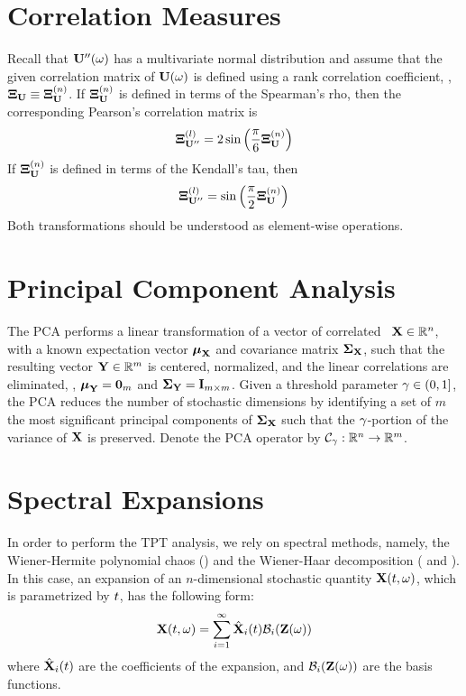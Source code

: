 \renewcommand{\thesection}{S\arabic{section}}
\renewcommand{\thetable}{S\arabic{table}}
\renewcommand{\thefigure}{S\arabic{figure}}
\setcounter{table}{0}
\setcounter{figure}{0}

\section{Correlation Measures} 
Recall that $\mathbf{U}''(\omega)$ has a multivariate normal distribution and assume that the given correlation matrix of $\mathbf{U}(\omega)$ is defined using a rank correlation coefficient, \ie, $\mathbf{\Xi}_{\mathbf{U}} \equiv \mathbf{\Xi}^{(n)}_{\mathbf{U}}$. If $\mathbf{\Xi}^{(n)}_{\mathbf{U}}$ is defined in terms of the Spearman's rho, then the corresponding Pearson's correlation matrix is
\[
  \mathbf{\Xi}^{(l)}_{\mathbf{U}''} = 2 \sin \left( \frac{\pi}{6} \mathbf{\Xi}^{(n)}_{\mathbf{U}} \right)
\]
If $\mathbf{\Xi}^{(n)}_{\mathbf{U}}$ is defined in terms of the Kendall's tau, then
\[
  \mathbf{\Xi}^{(l)}_{\mathbf{U}''} = \sin \left( \frac{\pi}{2} \mathbf{\Xi}^{(n)}_{\mathbf{U}} \right)
\]
Both transformations should be understood as element-wise operations.

\section{Principal Component Analysis} 
The PCA performs a linear transformation of a vector of correlated \rvs\ $\mathbf{X} \in \mathbb{R}^n$, with a known expectation vector $\boldsymbol{\mu}_{\mathbf{X}}$ and covariance matrix $\mathbf{\Sigma}_{\mathbf{X}}$, such that the resulting vector $\mathbf{Y} \in \mathbb{R}^m$ is centered, normalized, and the linear correlations are eliminated, \ie, $\boldsymbol{\mu}_{\mathbf{Y}} = \mathbf{0}_m$ and $\mathbf{\Sigma}_{\mathbf{Y}} = \mathbf{I}_{m \times m}$. Given a threshold parameter $\gamma \in (0, 1]$, the PCA reduces the number of stochastic dimensions by identifying a set of $m$ the most significant principal components of $\mathbf{\Sigma}_{\mathbf{X}}$ such that the $\gamma$-portion of the variance of $\mathbf{X}$ is preserved. Denote the PCA operator by $\oPCA: \real^n \to \real^m$.

\section{Spectral Expansions} 
In order to perform the TPT analysis, we rely on spectral methods, namely, the Wiener-Hermite polynomial chaos () and the Wiener-Haar decomposition ( and ). In this case, an expansion of an $n$-dimensional stochastic quantity $\mathbf{X}(t, \omega)$, which is parametrized by $t$, has the following form:
\[
  \mathbf{X}(t, \omega) = \sum_{i = 1}^\infty \hat{\mathbf{X}}_i(t) \mathcal{B}_i(\mathbf{Z}(\omega))
\]
where $\hat{\mathbf{X}}_i(t)$ are the coefficients of the expansion, and $\mathcal{B}_i(\mathbf{Z}(\omega))$ are the basis functions.

